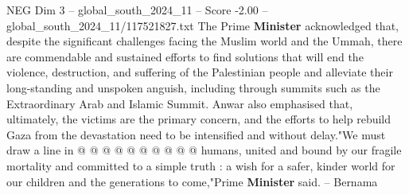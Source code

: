 \begin{textsample}{NEG Dim 3 – global\_south\_2024\_11 – Score -2.00 – global\_south\_2024\_11/117521827.txt}
The Prime \textbf{Minister} acknowledged that, despite the significant challenges facing the Muslim world and the Ummah, there are commendable and sustained efforts to find solutions that will end the violence, destruction, and suffering of the Palestinian people and alleviate their long-standing and unspoken anguish, including through summits such as the Extraordinary Arab and Islamic Summit.
Anwar also emphasised that, ultimately, the victims are the primary concern, and the efforts to help rebuild Gaza from the devastation need to be intensified and without delay."We must draw a line in @ @ @ @ @ @ @ @ @ @ humans, united and bound by our fragile mortality and committed to a simple truth : a wish for a safer, kinder world for our children and the generations to come,"Prime \textbf{Minister} said. -- Bernama

\end{textsample}
